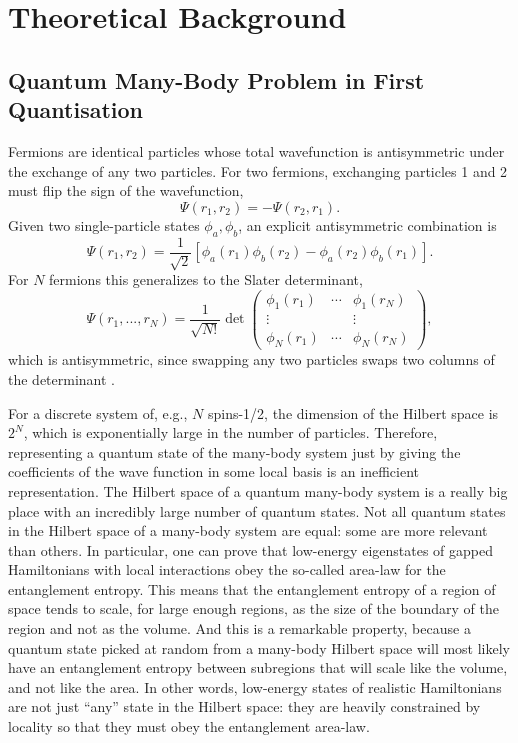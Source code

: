 \documentclass[a4paper,11pt,twoside]{article}
\begin{document}
\thispagestyle{plain}


\section{Theoretical Background}

\subsection{Quantum Many-Body Problem in First Quantisation}



Fermions are identical particles whose total wavefunction is antisymmetric under the exchange of any two particles. For two fermions, exchanging particles 1 and 2 must flip the sign of the wavefunction,
\begin{equation}
    \Psi(r_1, r_2) = -\Psi(r_2, r_1).
\end{equation}
Given two single-particle states $\phi_a, \phi_b$, an explicit antisymmetric combination is
\begin{equation}
    \Psi(r_1,r_2) = \frac{1}{\sqrt{2}}\left[\phi_a(r_1)\phi_b(r_2) - \phi_a(r_2)\phi_b(r_1)\right].
\end{equation}
For $N$ fermions this generalizes to the Slater determinant,
\begin{equation}
    \Psi(r_1,...,r_N) = \frac{1}{\sqrt{N!}} \det \begin{pmatrix} \phi_1(r_1) & \cdots & \phi_1(r_N) \\ \vdots & & \vdots \\ \phi_N(r_1) & \cdots & \phi_N(r_N)\end{pmatrix},
\end{equation}
which is antisymmetric, since swapping any two particles swaps two columns of the determinant \cite{griffiths_introduction_2008}.

\cite{orus_practical_2014} For a discrete system of, e.g., $N$ spins-1/2, the dimension of the Hilbert space is $2^N$, which
is exponentially large in the number of particles. Therefore, representing a quantum state of the
many-body system just by giving the coefficients of the wave function in some local basis is an
inefficient representation. The Hilbert space of a quantum many-body system is a really big place
with an incredibly large number of quantum states. Not all quantum states in the Hilbert space of a many-body system are equal: some are more relevant than others.
In particular, one can prove that low-energy eigenstates of gapped Hamiltonians with local interactions obey the so-called area-law for the entanglement entropy. This means that the entanglement entropy of a region of space tends to scale, for large enough regions, as the size of the boundary of the region and not as the volume. And this is a remarkable property, because a quantum state picked at random from a many-body Hilbert space will most likely have an entanglement entropy between subregions that will scale like the volume, and not like the area. In other words, low-energy states of realistic Hamiltonians are not just “any” state in the Hilbert space: they are heavily constrained by locality so that they must obey the entanglement area-law.
\end{document}
